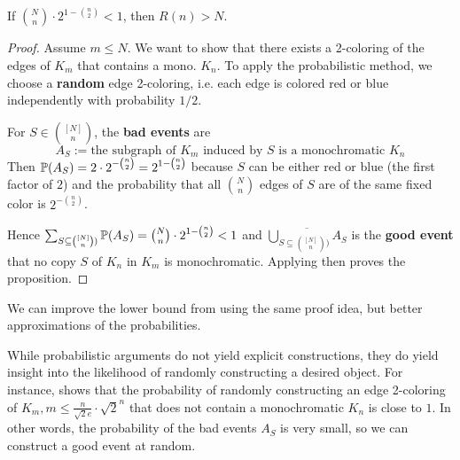 \documentclass[../main.tex]{subfiles}
\begin{document}
\begin{proposition}[Erd\"os 1947]\label{prop:ramseyLowerProb}
	If $\binom{N}{n} \cdot 2^{1-\binom{n}{2}} < 1$, then $R(n) > N$.
\end{proposition}

\begin{proof}
Assume $m \leq N$. We want to show that there exists a 2-coloring of the edges of $K_m$ that contains a mono. $K_n$. To apply the probabilistic method, we choose a \textbf{random} edge 2-coloring, i.e. each edge is colored red or blue independently with probability $1/2$. 

For $S \in \binom{[N]}{n}$, the \textbf{bad events} are 
$$A_S := \text{the subgraph of } K_m \text{ induced by } S \text{ is a monochromatic } K_n$$
Then $\mathbb{P}(A_S) = 2 \cdot 2^{-\binom{n}{2}} = 2^{1-\binom{n}{2}}$ because $S$ can be either red or blue (the first factor of $2$) and the probability that all $\binom{N}{n}$ edges of $S$ are of the same fixed color is $2^{-\binom{n}{2}}$.

Hence $\sum_{S \subseteq \binom{[N]}{n})} \mathbb{P}(A_S) = \binom{N}{n} \cdot 2^{1-\binom{n}{2}} < 1$ and $\overline{\bigcup_{S \subseteq \binom{[N]}{n})} A_S}$ is the \textbf{good event} that no copy $S$ of $K_n$ in $K_m$ is monochromatic. Applying  then proves the proposition.
\end{proof}

We can improve the lower bound from  using the same proof idea, but better approximations of the probabilities.
\begin{corollary}\label{cor:ramseyBetterProb}
	\TODO
\end{corollary}

\begin{remark}
	While probabilistic arguments do not yield explicit constructions, they do yield insight into the likelihood of randomly constructing a desired object. For instance,  shows that the probability of randomly constructing an edge 2-coloring of $K_m, m \leq \frac{n}{\sqrt{2}e}\cdot\sqrt{2}^n$ that does not contain a monochromatic $K_n$ is close to $1$. In other words, the probability of the bad events $A_S$ is very small, so we can construct a good event at random.
\end{remark}

\begin{example}
	\TODO
\end{example}	
	
		
\end{document}
